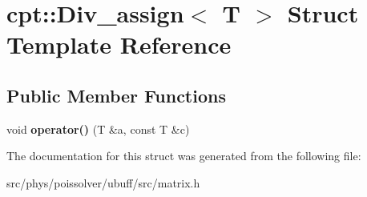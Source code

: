 \hypertarget{structcpt_1_1Div__assign}{}\section{cpt\+:\+:Div\+\_\+assign$<$ T $>$ Struct Template Reference}
\label{structcpt_1_1Div__assign}
\subsection*{Public Member Functions}
\begin{DoxyCompactItemize}
\item 
void {\bfseries operator()} (T \&a, const T \&c)\hypertarget{structcpt_1_1Div__assign_a673bf16badb49764e8d091d4a2ba3a73}{}\label{structcpt_1_1Div__assign_a673bf16badb49764e8d091d4a2ba3a73}

\end{DoxyCompactItemize}


The documentation for this struct was generated from the following file\+:\begin{DoxyCompactItemize}
\item 
src/phys/poissolver/ubuff/src/matrix.\+h\end{DoxyCompactItemize}
